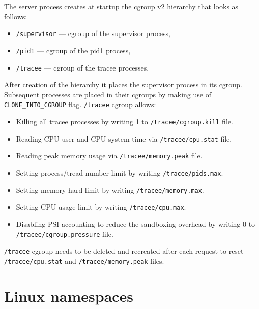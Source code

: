 \documentclass[en]{pracamgr}
\begin{document}
The server process creates at startup the cgroup v2 hierarchy that looks as follows:
\begin{itemize}
    \item \texttt{/supervisor} --- cgroup of the supervisor process,
    \item \texttt{/pid1} --- cgroup of the pid1 process,
    \item \texttt{/tracee} --- cgroup of the tracee processes.
\end{itemize}
After creation of the hierarchy it places the supervisor process in its cgroup. Subsequent processes are placed in their cgroups by making use of \texttt{CLONE\_INTO\_CGROUP} flag.
\newline
\texttt{/tracee} cgroup allows:
\begin{itemize}
    \item Killing all tracee processes by writing 1 to \texttt{/tracee/cgroup.kill} file.
    \item Reading CPU user and CPU system time via \texttt{/tracee/cpu.stat} file.
    \item Reading peak memory usage via \texttt{/tracee/memory.peak} file.
    \item Setting process/tread number limit by writing \texttt{/tracee/pids.max}.
    \item Setting memory hard limit by writing \texttt{/tracee/memory.max}.
    \item Setting CPU usage limit by writing \texttt{/tracee/cpu.max}.
    \item Disabling PSI accounting to reduce the sandboxing overhead by writing 0 to \\\texttt{/tracee/cgroup.pressure} file.
\end{itemize}
\texttt{/tracee} cgroup needs to be deleted and recreated after each request to reset \texttt{/tracee/cpu.stat} and \texttt{/tracee/memory.peak} files.

\section{Linux namespaces}
\end{document}
